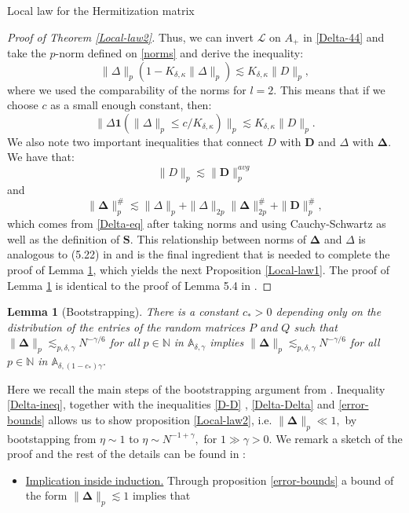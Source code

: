 \documentclass[11pt, a4paper, oneside]{book}
\numberwithin{equation}{chapter}
\newcommand{\beq}{\begin{equation}}
\newcommand{\eeq}{\end{equation}}
\newtheorem{lem}[thm]{Lemma}
\begin{document}
\begin{section}{Local law for the Hermitization matrix}
\begin{proof}[Proof of Theorem \ref{Local-law2}]
Thus, we can invert $\mathscr{L}$ on $A_+$ in \eqref{Delta-44} and take the $p$-norm defined on \eqref{norms} and derive the inequality:
\[
\|\Delta\|_p ( 1- K_{\delta, \kappa} \|\Delta\|_p ) \lesssim K_{\delta, \kappa} \|D\|_p ,
\]
where we used the comparability of the norms for $l=2.$ This means that if we choose $c$ as a small enough constant, then:
\beq \label{Delta-ineq}
\| \Delta \mathbf{1}( \|\Delta\|_p \leq {c}/{K_{\delta, \kappa}}) \|_p \lesssim K_{\delta, \kappa} \| D \|_p .
\eeq
%
%
We also note two important inequalities that connect $D$ with $\mathbf{D}$ and $\Delta$ with $\mathbf{\Delta}$. We have that:
\beq \label{D-D}
\|D\|_p \lesssim \|\mathbf{D}\|_p^{avg}
\eeq
and
\beq \label{Delta-Delta}
\|\mathbf{\Delta}\|_p^{\#} \lesssim \|\Delta\|_p + \|\Delta\|_{2p} \|\mathbf{\Delta}\|_{2p}^{\#} + \|\mathbf{D}\|_{p}^{\#},
\eeq
%
which comes from \eqref{Delta-eq} after taking norms and using Cauchy-Schwartz as well as the definition of $\bm{S}.$ This relationship between norms of $\mathbf{\Delta}$ and $\Delta$ is analogous to (5.22) in \cite{alt2022local} and is  the final ingredient that is needed to complete the proof of Lemma \ref{Boot}, which yields the next Proposition \ref{Local-law1}. The proof of Lemma \ref{Boot} is identical to the proof of Lemma 5.4 in \cite{alt2022local}.
\end{proof}
%
\begin{lem}[Bootstrapping] \label{Boot}
There is a constant $c_*>0$ depending only on the distribution of the entries of the random matrices $P$ and $Q$ such that $\|\mathbf{\Delta}\|_p \lesssim_{p,\delta,\gamma} N^{-\gamma/6}$ for all $p \in \mathbb{N}$ in $\mathbb{A}_{\delta,\gamma}$ implies $\|\mathbf{\Delta}\|_p \lesssim_{p,\delta,\gamma} N^{-\gamma/6}$ for all $p \in \mathbb{N}$ in $\mathbb{A}_{\delta,(1-c_*)\gamma}.$
\end{lem}
%
\pagebreak
%
Here we recall the main steps of the bootstrapping argument from \cite{alt2022local}. Inequality \eqref{Delta-ineq}, together with the inequalities \eqref{D-D} , \eqref{Delta-Delta} and \eqref{error-bounds} allows us to show proposition \ref{Local-law2}, i.e. $\|\mathbf{\Delta}\|_p \ll 1,$ by bootstapping from $\eta \sim 1$ to $\eta \sim N^{-1+\gamma},$ for $1 \gg \gamma>0.$ We remark a sketch of the proof and the rest of the details can be found in \cite{alt2022local}:
%
\begin{itemize}
    \item \underline{Implication inside induction.} Through proposition \eqref{error-bounds} a bound of the form $\|\mathbf{\Delta}\|_p \lesssim 1$ implies that

\end{itemize}
\end{section}
\end{document}

